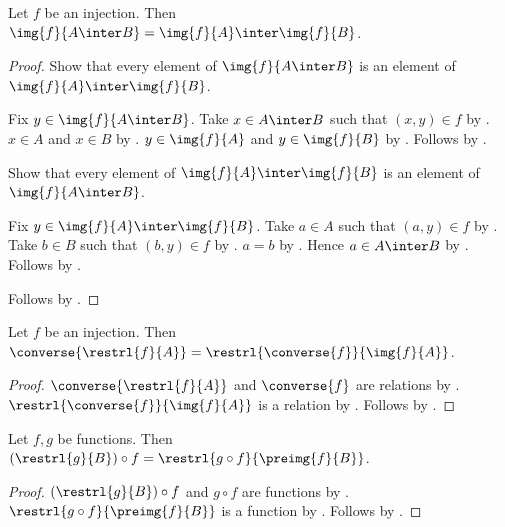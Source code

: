 \begin{theorem}\label{injective_image_intersection}
    Let $f$ be an injection.
    Then $\img{f}{A\inter B}=\img{f}{A}\inter\img{f}{B}$.
\end{theorem}
\begin{proof}
    Show that every element of $\img{f}{A\inter B}$
        is an element of $\img{f}{A}\inter\img{f}{B}$.
    \begin{subproof}
        Fix $y\in\img{f}{A\inter B}$.
        Take $x\in A\inter B$ such that $(x,y)\in f$ by .
        $x\in A$ and $x\in B$ by .
        $y\in\img{f}{A}$ and $y\in\img{f}{B}$ by .
        Follows by .
    \end{subproof}
    Show that every element of $\img{f}{A}\inter\img{f}{B}$
        is an element of $\img{f}{A\inter B}$.
    \begin{subproof}
        Fix $y\in\img{f}{A}\inter\img{f}{B}$.
        Take $a\in A$ such that $(a,y)\in f$ by .
        Take $b\in B$ such that $(b,y)\in f$ by .
        $a=b$ by .
        Hence $a\in A\inter B$ by .
        Follows by .
    \end{subproof}
    Follows by .
\end{proof}

\begin{theorem}\label{restriction_converse}
    Let $f$ be an injection.
    Then $\converse{\restrl{f}{A}}
        =\restrl{\converse{f}}{\img{f}{A}}$.
\end{theorem}
\begin{proof}
    $\converse{\restrl{f}{A}}$ and $\converse{f}$ are relations by
        .
    $\restrl{\converse{f}}{\img{f}{A}}$ is a relation by
        .
    Follows by .
\end{proof}

\begin{theorem}\label{partial_composition_restrict_target}
    Let $f,g$ be functions.
    Then $(\restrl{g}{B})\circ f
        =\restrl{g\circ f}{\preimg{f}{B}}$.
\end{theorem}
\begin{proof}
    $(\restrl{g}{B})\circ f$ and $g\circ f$ are functions by
        .
    $\restrl{g\circ f}{\preimg{f}{B}}$ is a function by
        .
    Follows by
        .
\end{proof}

